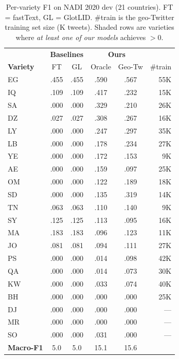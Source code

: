 \documentclass[11pt]{article}
\begin{document}
\begin{table}[t]
\centering
\small
\setlength{\tabcolsep}{4.5pt}
\begin{tabular}{l|cc|cc|r}
\toprule
 & \multicolumn{2}{c|}{\textbf{Baselines}} & \multicolumn{2}{c|}{\textbf{Ours}} & \\
\textbf{Variety} & FT & GL & Oracle & Geo-Tw & \#train \\
\midrule
\rowcolor{good}
EG  & .455 & .455 & .590 & .567 & 55K \\
\rowcolor{good}
IQ  & .109 & .109 & .417 & .232 & 15K \\
\rowcolor{good}
SA  & .000 & .000 & .329 & .210 & 26K \\
\rowcolor{good}
DZ  & .027 & .027 & .308 & .267 & 16K \\
\rowcolor{good}
LY  & .000 & .000 & .247 & .297 & 35K \\
\rowcolor{good}
LB  & .000 & .000 & .178 & .234 & 27K \\
\rowcolor{good}
YE  & .000 & .000 & .172 & .153 &  9K \\
\rowcolor{good}
AE  & .000 & .000 & .159 & .097 & 25K \\
\rowcolor{good}
OM  & .000 & .000 & .122 & .189 & 18K \\
\rowcolor{good}
SD  & .000 & .000 & .135 & .319 & 14K \\
\rowcolor{good}
TN  & .063 & .063 & .110 & .140 &  9K \\
\rowcolor{good}
SY  & .125 & .125 & .113 & .095 & 16K \\
MA  & .183 & .183 & .096 & .123 & 11K \\
JO  & .081 & .081 & .094 & .111 & 27K \\
PS  & .000 & .000 & .014 & .098 & 42K \\
QA  & .000 & .000 & .014 & .073 & 30K \\
KW  & .000 & .000 & .033 & .074 & 40K \\
\midrule
BH  & .000 & .000 & .000 & .000 & 25K \\
DJ  & .000 & .000 & .000 & .000 & --- \\
MR  & .000 & .000 & .000 & .000 & --- \\
SO  & .000 & .000 & .031 & .000 & --- \\
\midrule
\textbf{Macro-F1} & 5.0 & 5.0 & 15.1 & 15.6 & \\
\bottomrule
\end{tabular}
\caption{Per-variety F1 on NADI 2020 dev (21 countries). FT = fastText,
GL = GlotLID. \#train is the geo-Twitter training set size (K tweets).
Shaded rows are varieties where \emph{at least one of our models} achieves $>0$.}
\label{tab:per-variety}
\end{table}
\end{document}
